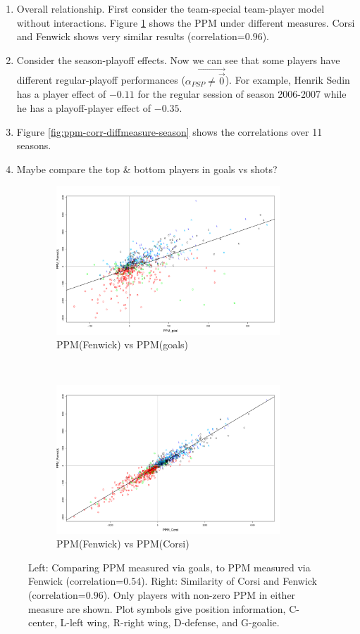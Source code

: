 \begin{enumerate}
	\item Overall relationship. First consider the team-special team-player model without interactions. Figure \ref{fig:ppm_diffmeasure} shows the PPM under different measures. Corsi and Fenwick shows very similar results (correlation=$0.96$). 
	\item Consider the season-playoff effects. Now we can see that some players have different regular-playoff performances ($\vec{\alpha_{PSP}\neq \vec{0}}$). For example, Henrik Sedin has a player effect of $-0.11$ for the regular session of season 2006-2007 while he has a playoff-player effect of $-0.35$.
	\item Figure \ref{fig:ppm-corr-diffmeasure-season} shows the correlations over 11 seasons. 
	\item Maybe compare the top \& bottom players in goals vs shots?
\end{enumerate}

\begin{figure}[t!]
	\centering
	\begin{subfigure}[t]{0.5\textwidth}
		\centering
		\includegraphics[height=2.2in]{figures/fenwickvsgoals_overall.pdf}
		\caption{PPM(Fenwick) vs PPM(goals)}
	\end{subfigure}%
	~ 
	\begin{subfigure}[t]{0.5\textwidth}
		\centering
		\includegraphics[height=2.2in]{figures/fenwickvscorsi_overall.pdf}
		\caption{PPM(Fenwick) vs PPM(Corsi)}
	\end{subfigure}
	\caption{Left: Comparing PPM measured via goals, to PPM measured via Fenwick (correlation=$0.54$). Right: Similarity of Corsi and Fenwick (correlation=$0.96$). Only players with non-zero PPM in either measure are shown. Plot symbols give position information, C-center, L-left wing, R-right wing, D-defense, and G-goalie.}
	\label{fig:ppm_diffmeasure}
\end{figure}

